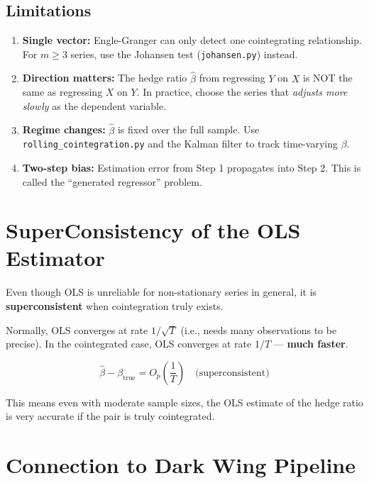 \documentclass[12pt, a4paper]{article}
\begin{document}
\subsection{Limitations}
\begin{enumerate}
    \item \textbf{Single vector:} Engle-Granger can only detect one cointegrating relationship.
          For $m \geq 3$ series, use the Johansen test (\texttt{johansen.py}) instead.
    \item \textbf{Direction matters:} The hedge ratio $\hat\beta$ from regressing $Y$ on $X$ 
          is NOT the same as regressing $X$ on $Y$. In practice, choose the series that 
          \emph{adjusts more slowly} as the dependent variable.
    \item \textbf{Regime changes:} $\hat\beta$ is fixed over the full sample. Use 
          \texttt{rolling\_cointegration.py} and the Kalman filter to track time-varying $\beta$.
    \item \textbf{Two-step bias:} Estimation error from Step 1 propagates into Step 2.
          This is called the ``generated regressor'' problem.
\end{enumerate}

\section{SuperConsistency of the OLS Estimator}

Even though OLS is unreliable for non-stationary series in general, 
it is \textbf{superconsistent} when cointegration truly exists.

\medskip
Normally, OLS converges at rate $1/\sqrt{T}$ (i.e., needs many observations to be precise).
In the cointegrated case, OLS converges at rate $1/T$ — \textbf{much faster}.

\begin{equation}
    \hat\beta - \beta_{\text{true}} = O_p\left(\frac{1}{T}\right) \quad \text{(superconsistent)}
\end{equation}

This means even with moderate sample sizes, the OLS estimate of the hedge ratio is very accurate 
if the pair is truly cointegrated.

\section{Connection to Dark Wing Pipeline}
\end{document}
